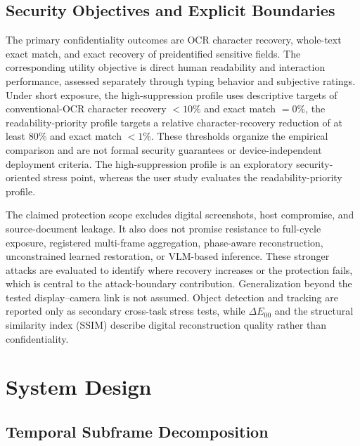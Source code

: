 \documentclass{ieeeaccess}
\begin{document}
\subsection{Security Objectives and Explicit Boundaries}

The primary confidentiality outcomes are OCR character recovery, whole-text exact match, and exact recovery of preidentified sensitive fields. The corresponding utility objective is direct human readability and interaction performance, assessed separately through typing behavior and subjective ratings. Under short exposure, the high-suppression profile uses descriptive targets of conventional-OCR character recovery $<10\%$ and exact match $=0\%$, the readability-priority profile targets a relative character-recovery reduction of at least 80\% and exact match $<1\%$. These thresholds organize the empirical comparison and are not formal security guarantees or device-independent deployment criteria. The high-suppression profile is an exploratory security-oriented stress point, whereas the user study evaluates the readability-priority profile.

The claimed protection scope excludes digital screenshots, host compromise, and source-document leakage. It also does not promise resistance to full-cycle exposure, registered multi-frame aggregation, phase-aware reconstruction, unconstrained learned restoration, or VLM-based inference. These stronger attacks are evaluated to identify where recovery increases or the protection fails, which is central to the attack-boundary contribution. Generalization beyond the tested display--camera link is not assumed. Object detection and tracking are reported only as secondary cross-task stress tests, while $\Delta E_{00}$ and the structural similarity index (SSIM) describe digital reconstruction quality rather than confidentiality.


\section{System Design}
\label{sec:method}

\subsection{Temporal Subframe Decomposition}
\end{document}
